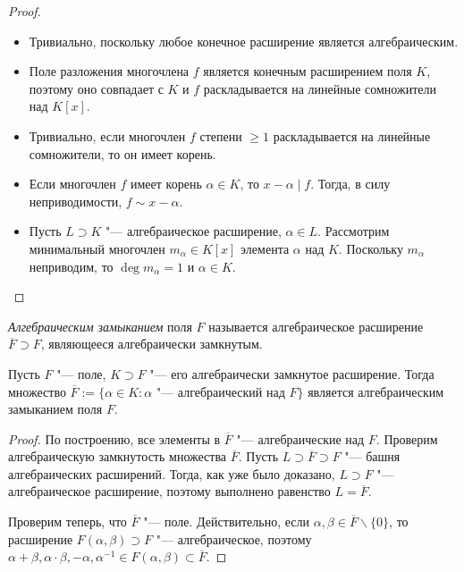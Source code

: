 \begin{proof}~
	\begin{itemize}
		\item{}Тривиально, поскольку любое конечное расширение является алгебраическим.
		\item{}Поле разложения многочлена $f$ является конечным расширением поля $K$, поэтому оно совпадает с $K$ и $f$ раскладывается на линейные сомножители над $K[x]$.
		\item{}Тривиально, если многочлен $f$ степени $\ge 1$ раскладывается на линейные сомножители, то он имеет корень.
		\item{}Если многочлен $f$ имеет корень $\alpha \in K$, то $x - \alpha \mid f$. Тогда, в силу неприводимости, $f \sim x - \alpha$.
		\item{}Пусть $L \supset K$ "--- алгебраическое расширение, $\alpha \in L$. Рассмотрим минимальный многочлен $m_\alpha \in K[x]$ элемента $\alpha$ над $K$. Поскольку $m_\alpha$ неприводим, то $\deg{m_\alpha} = 1$ и $\alpha \in K$.\qedhere
	\end{itemize}
\end{proof}

\begin{definition}
	\textit{Алгебраическим замыканием} поля $F$ называется алгебраическое расширение $\overline{F} \supset F$, являющееся алгебраически замкнутым.
\end{definition}

\begin{proposition}
	Пусть $F$ "--- поле, $K \supset F$ "--- его алгебраически замкнутое расширение. Тогда множество $\overline{F} := \{\alpha \in K: \alpha\text{ "--- алгебраический над }F\}$ является алгебраическим замыканием поля $F$.
\end{proposition}

\begin{proof}
	По построению, все элементы в $\overline{F}$ "--- алгебраические над $F$. \pagebreak Проверим алгебраическую замкнутость множества $\overline{F}$. Пусть $L \supset \overline{F} \supset F$ "--- башня алгебраических расширений. Тогда, как уже было доказано, $L \supset F$ "--- алгебраическое расширение, поэтому выполнено равенство $L = \overline{F}$.
	
	Проверим теперь, что $\overline{F}$ "--- поле. Действительно, если $\alpha, \beta \in \overline{F} \backslash \{0\}$, то расширение $F(\alpha, \beta) \supset F$ "--- алгебраическое, поэтому $\alpha + \beta, \alpha \cdot \beta, -\alpha, \alpha^{-1} \in F(\alpha, \beta) \subset \overline{F}$.
\end{proof}

